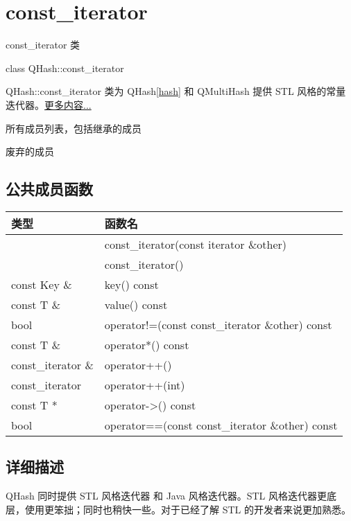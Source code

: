 \chapter{const\_iterator}

const\_iterator 类

class QHash::const\_iterator

QHash::const\_iterator 类为 QHash\ref{hash} 和 QMultiHash 提供 STL 风格的常量迭代器。\href{https://github.com/JackLovel/QtDocumentCN/blob/master/Src/H/QHash/QHash-const-iterator.md#%E8%AF%A6%E7%BB%86%E6%8F%8F%E8%BF%B0}{更多内容...}

\begin{compactitem}
\item 所有成员列表，包括继承的成员
\item 废弃的成员
\end{compactitem}

\splitLine

\section{公共成员函数}

\begin{tabular}{|l|l|}
\hline
类型	&函数名\\
\hline
 	&const\_iterator(const iterator \&other)\\
\hline
	&const\_iterator()\\
\hline
const Key \& &	key() const\\
\hline
const T \& &	value() const\\
\hline
bool &	operator!=(const const\_iterator \&other) const\\
\hline
const T \& &	operator*() const\\
\hline
const\_iterator \& &	operator++()\\
\hline
const\_iterator 	&operator++(int)\\
\hline
const T * 	&operator->() const\\
\hline
bool 	&operator==(const const\_iterator \&other) const\\
\hline
\end{tabular}


\splitLine

\section{详细描述}

QHash 同时提供 STL 风格迭代器 和 Java 风格迭代器。STL 风格迭代器更底层，使用更笨拙；同时也稍快一些。对于已经了解 STL 的开发者来说更加熟悉。

